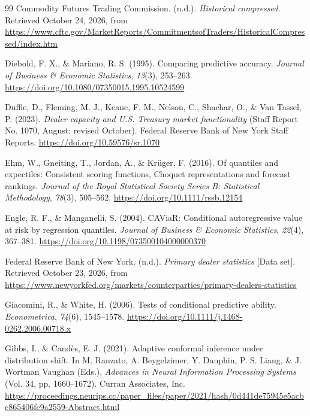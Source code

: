 \documentclass[11pt,a4paper]{article}
\begin{document}
\begin{thebibliography}{99}
 Commodity Futures Trading Commission. (n.d.). \emph{Historical compressed}. Retrieved October 24, 2026, from \url{https://www.cftc.gov/MarketReports/CommitmentsofTraders/HistoricalCompressed/index.htm}

 Diebold, F. X., \& Mariano, R. S. (1995). Comparing predictive accuracy. \emph{Journal of Business \& Economic Statistics}, \emph{13}(3), 253--263. \url{https://doi.org/10.1080/07350015.1995.10524599}

 Duffie, D., Fleming, M. J., Keane, F. M., Nelson, C., Shachar, O., \& Van Tassel, P. (2023). \emph{Dealer capacity and U.S. Treasury market functionality} (Staff Report No. 1070, August; revised October). Federal Reserve Bank of New York Staff Reports. \url{https://doi.org/10.59576/sr.1070}

 Ehm, W., Gneiting, T., Jordan, A., \& Krüger, F. (2016). Of quantiles and expectiles: Consistent scoring functions, Choquet representations and forecast rankings. \emph{Journal of the Royal Statistical Society Series B: Statistical Methodology}, \emph{78}(3), 505--562. \url{https://doi.org/10.1111/rssb.12154}

 Engle, R. F., \& Manganelli, S. (2004). CAViaR: Conditional autoregressive value at risk by regression quantiles. \emph{Journal of Business \& Economic Statistics}, \emph{22}(4), 367--381. \url{https://doi.org/10.1198/073500104000000370}

 Federal Reserve Bank of New York. (n.d.). \emph{Primary dealer statistics} [Data set]. Retrieved October 23, 2026, from \url{https://www.newyorkfed.org/markets/counterparties/primary-dealers-statistics}

 Giacomini, R., \& White, H. (2006). Tests of conditional predictive ability. \emph{Econometrica}, \emph{74}(6), 1545--1578. \url{https://doi.org/10.1111/j.1468-0262.2006.00718.x}

 Gibbs, I., \& Candès, E. J. (2021). Adaptive conformal inference under distribution shift. In M. Ranzato, A. Beygelzimer, Y. Dauphin, P. S. Liang, \& J. Wortman Vaughan (Eds.), \emph{Advances in Neural Information Processing Systems} (Vol. 34, pp. 1660--1672). Curran Associates, Inc. \url{https://proceedings.neurips.cc/paper_files/paper/2021/hash/0d441de75945e5acbc865406fc9a2559-Abstract.html}


\end{thebibliography}
\end{document}
